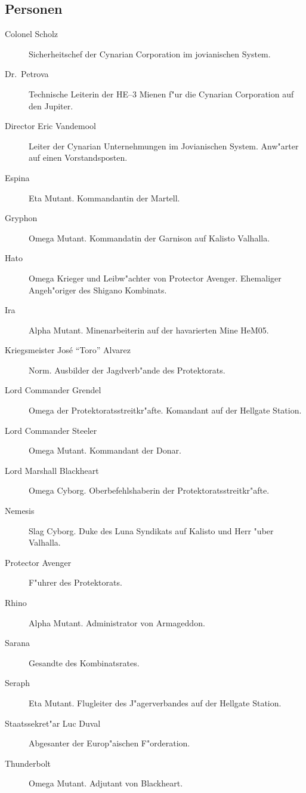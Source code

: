 \begin{appendices}
\section{Personen}

\begin{description}
\item [Colonel Scholz] Sicherheitschef der Cynarian Corporation im jovianischen System.
\item [Dr.~Petrova] Technische Leiterin der HE--3 Mienen f"ur die Cynarian Corporation auf den Jupiter.
\item [Director Eric Vandemool] Leiter der Cynarian Unternehmungen im Jovianischen System. Anw"arter auf einen
      Vorstandsposten.
\item [Espina] Eta Mutant. Kommandantin der Martell.
\item [Gryphon] Omega Mutant. Kommandatin der Garnison auf Kalisto Valhalla.
\item [Hato] Omega Krieger und Leibw"achter von Protector Avenger. Ehemaliger Angeh"origer des Shigano Kombinats.
\item [Ira] Alpha Mutant. Minenarbeiterin auf der havarierten Mine HeM05.
\item [Kriegsmeister Jos\'{e} ``Toro'' Alvarez] Norm. Ausbilder der Jagdverb"ande des Protektorats.
\item [Lord Commander Grendel] Omega der Protektoratsstreitkr"afte. Komandant auf der Hellgate Station.
\item [Lord Commander Steeler] Omega Mutant. Kommandant der Donar.
\item [Lord Marshall Blackheart] Omega Cyborg. Oberbefehlshaberin der Protektoratsstreitkr"afte.
\item [Nemesis] Slag Cyborg. Duke des Luna Syndikats auf Kalisto und Herr "uber Valhalla.
\item [Protector Avenger] F"uhrer des Protektorats.
\item [Rhino] Alpha Mutant. Administrator von Armageddon.
\item [Sarana] Gesandte des Kombinatsrates.
\item [Seraph] Eta Mutant. Flugleiter des J"agerverbandes auf der Hellgate Station.
\item [Staatssekret"ar Luc Duval] Abgesanter der Europ"aischen F"orderation.
\item [Thunderbolt] Omega Mutant. Adjutant von Blackheart.
\end{description}

\end{appendices}